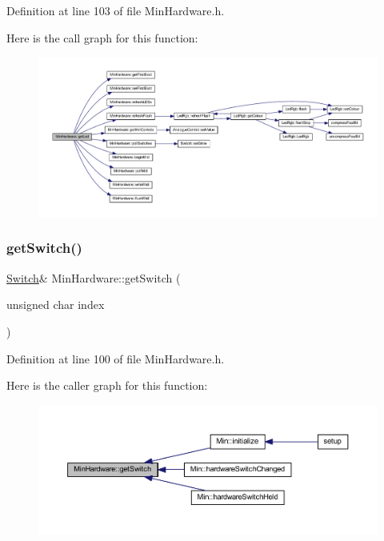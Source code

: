 Definition at line 103 of file Min\+Hardware.\+h.

Here is the call graph for this function\+:
\nopagebreak
\begin{figure}[H]
\begin{center}
\leavevmode
\includegraphics[width=350pt]{d0/d93/class_min_hardware_af0f53594d24df7d75360ccccd0f582d3_cgraph}
\end{center}
\end{figure}
\mbox{\label{class_min_hardware_a7e3fdfca776cd833f4ab859c25232c9c}} 
\subsubsection{\texorpdfstring{get\+Switch()}{getSwitch()}\hspace{0.1cm}{\footnotesize\ttfamily [1/2]}}
{\footnotesize\ttfamily \hyperlink{class_switch}{Switch}\& Min\+Hardware\+::get\+Switch (\begin{DoxyParamCaption}\item[{unsigned char}]{index }\end{DoxyParamCaption})\hspace{0.3cm}{\ttfamily [inline]}}



Definition at line 100 of file Min\+Hardware.\+h.

Here is the caller graph for this function\+:
\nopagebreak
\begin{figure}[H]
\begin{center}
\leavevmode
\includegraphics[width=350pt]{d0/d93/class_min_hardware_a7e3fdfca776cd833f4ab859c25232c9c_icgraph}
\end{center}
\end{figure}
\mbox{\label{class_min_hardware_a874ff2353b74b2fefadd2f9322995617}} 
